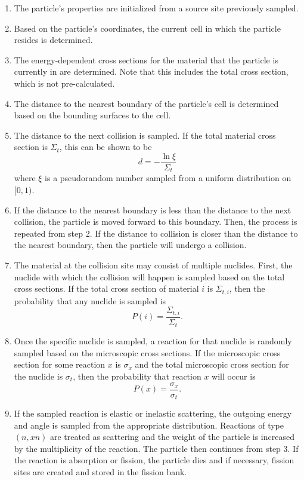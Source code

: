 \begin{enumerate}
\item The particle's properties are initialized from a source site previously
  sampled.
\item Based on the particle's coordinates, the current cell in which the
  particle resides is determined.
\item The energy-dependent cross sections for the material that the particle is
  currently in are determined. Note that this includes the total cross section,
  which is not pre-calculated.
\item The distance to the nearest boundary of the particle's cell is determined
  based on the bounding surfaces to the cell.
\item The distance to the next collision is sampled. If the total material
  cross section is $\Sigma_t$, this can be shown to be
  \begin{equation}
    d = -\frac{\ln \xi}{\Sigma_t}
  \end{equation}
  where $\xi$ is a pseudorandom number sampled from a uniform distribution on
  $[0,1)$.
\item If the distance to the nearest boundary is less than the distance to the
  next collision, the particle is moved forward to this boundary. Then, the
  process is repeated from step 2. If the distance to collision is closer than
  the distance to the nearest boundary, then the particle will undergo a
  collision.
\item The material at the collision site may consist of multiple
  nuclides. First, the nuclide with which the collision will happen is sampled
  based on the total cross sections. If the total cross section of material $i$
  is $\Sigma_{t,i}$, then the probability that any nuclide is sampled is
  \begin{equation}
    P(i) = \frac{\Sigma_{t,i}}{\Sigma_t}.
  \end{equation}
\item Once the specific nuclide is sampled, a reaction for that nuclide is
  randomly sampled based on the microscopic cross sections. If the microscopic
  cross section for some reaction $x$ is $\sigma_x$ and the total microscopic
  cross section for the nuclide is $\sigma_t$, then the probability that
  reaction $x$ will occur is
  \begin{equation}
    P(x) = \frac{\sigma_x}{\sigma_t}.
  \end{equation}
\item If the sampled reaction is elastic or inelastic scattering, the outgoing
  energy and angle is sampled from the appropriate distribution.  Reactions of
  type $(n,xn)$ are treated as scattering and the weight of the particle is
  increased by the multiplicity of the reaction. The particle then continues
  from step 3. If the reaction is absorption or fission, the particle dies and
  if necessary, fission sites are created and stored in the fission bank.
\end{enumerate}
